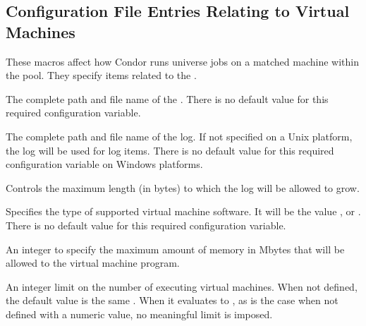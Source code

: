 \subsection{\label{sec:Config-VMs}Configuration File Entries
Relating to Virtual Machines}

These macros affect how Condor runs  universe jobs on
a matched machine within the pool.
They specify items related to the .

\begin{description}
\label{param:VMGAHPServer}
\item[\Macro{VM\_GAHP\_SERVER}]
  The complete path and file name of the .
  There is no default value for this required configuration variable.

\label{param:VMGAHPLog}
\item[\Macro{VM\_GAHP\_LOG}]
  The complete path and file name of the  log.
  If not specified on a Unix platform, the 
  log will be used for  log items. 
  There is no default value for this required configuration variable
  on Windows platforms.

\label{param:MaxVMGAHPLog}
\item[\Macro{MAX\_VM\_GAHP\_LOG}]
  Controls the maximum length (in bytes) to which the  log
  will be allowed to grow.

\label{param:VMType}
\item[\Macro{VM\_TYPE}]
  Specifies the type of supported virtual machine software.
  It will be the value \verb@kvm@, \verb@xen@ or \verb@vmware@.
  There is no default value for this required configuration variable.

\label{param:VMMaxMemory}
\item[\Macro{VM\_MEMORY}]
  An integer to specify the maximum amount of memory in Mbytes
  that will be allowed to the virtual machine program.

\label{param:VMMaxNumber}
\item[\Macro{VM\_MAX\_NUMBER}]
  An integer limit on the number of executing virtual machines.
  When not defined, the default value is the same .
  When it evaluates to ,
  as is the case when not defined with a numeric value,
  no meaningful limit is imposed.


\end{description}

